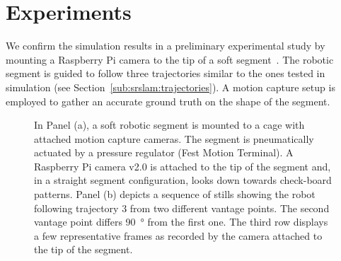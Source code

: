 \section{Experiments} \label{sec:srslam:experiments}
We confirm the simulation results in a preliminary experimental study by mounting a Raspberry Pi camera to the tip of a soft segment~\citep{katzschmann2019dynamic}. The robotic segment is guided to follow three trajectories similar to the ones tested in simulation (see Section~\ref{sub:srslam:trajectories}). %
A motion capture setup is employed to gather an accurate ground truth on the shape of the segment.

\begin{figure}
     \centering
     \caption{ In Panel (a), a soft robotic segment is mounted to a cage with attached motion capture cameras. The segment is pneumatically actuated by a pressure regulator (Fest Motion Terminal). A Raspberry Pi camera v2.0 is attached to the tip of the segment and, in a straight segment configuration, looks down towards check-board patterns. Panel (b) depicts a sequence of stills showing the robot following trajectory 3 from two different vantage points. The second vantage point differs \SI{90}{\degree} from the first one. The third row displays a few representative frames as recorded by the camera attached to the tip of the segment.}
\end{figure}

